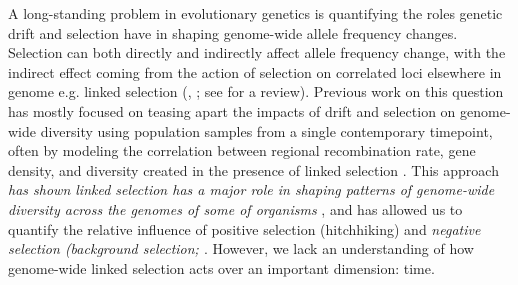 \documentclass[11pt]{article}
\newcommand{\vb}[1]{{\it \color{blue} #1}}
\begin{document}
A long-standing problem in evolutionary genetics is quantifying the roles
genetic drift and selection have in shaping genome-wide allele frequency
changes. Selection can both directly and indirectly affect allele frequency
change, with the indirect effect coming from the action of selection on
correlated loci elsewhere in genome e.g. linked selection
(\cite{Maynard_Smith1974-lc}, \cite{Charlesworth1993-gb,Nordborg1996-nq}; see
\cite{Barton2000-zg} for a review).  Previous work on this question has mostly
focused on teasing apart the impacts of drift and selection on genome-wide
diversity using population samples from a single contemporary timepoint, often
by modeling the correlation between regional recombination rate, gene density,
and diversity created in the presence of linked selection
\parencite{Begun1992-ey,Elyashiv2016-vt}. This approach \vb{has shown linked
  selection has a major role in shaping patterns of genome-wide diversity
across the genomes of some of organisms}
\parencite{Begun2007-bg,Beissinger2016-cm,Sattath2011-dr,Williamson2014-oy,Andersen2012-bj,Cutter2010-gi},
and has allowed us to quantify the relative influence of positive selection
(hitchhiking) and \vb{negative selection (background selection;
\cite{Nordborg2005-dc,McVicker2009-ax,Hernandez2011-gs,Elyashiv2016-vt}}.
However, we lack an understanding of how genome-wide linked selection acts over
an important dimension: time.
\end{document}
